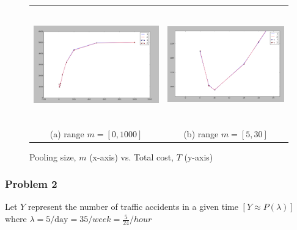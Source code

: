 \documentclass[11pt]{extarticle}
\begin{document}
\begin{enumerate}[(a)]
\begin{figure}[ht!]
\centering
\begin{tabular}{cc}
  \includegraphics[height=50mm]{P1.png} &   \includegraphics[height=50mm]{P1_2.png} \\
(a) range $m=[0,1000]$ & (b) range $m=[5,30]$ \\[6pt]

\end{tabular}
\caption{Pooling size, $m$ (x-axis) vs. Total cost, $T$ (y-axis)}
\end{figure}


\end{enumerate}

\subsubsection*{Problem 2}

Let $Y$ represent the number of traffic accidents in a given time $[Y \approx P(\lambda)]$ where $\lambda = 5/\text{day} = 35/week = \frac{5}{24}/hour $
\end{document}
